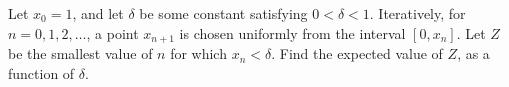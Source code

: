 Let $x_0 = 1$, and let $\delta$ be some constant satisfying $0 < \delta < 1$. Iteratively, for $n=0,1,2,\dots$, a point $x_{n+1}$ is chosen uniformly from the interval $[0, x_n]$. Let $Z$ be the smallest value of $n$ for which $x_n < \delta$.
Find the expected value of $Z$, as a function of $\delta$.

